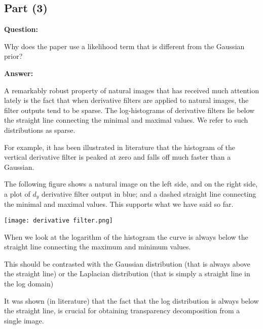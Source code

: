 \documentclass[fleqn, 11pt]{article}
\begin{document}
\subsection*{Part (3)}

\textbf{Question: }

\smallskip

Why does the paper use a likelihood term that is different from the Gaussian prior?

\hrulefill

\smallskip

\textbf{Answer: }

\smallskip

A remarkably robust property of natural images that has received much attention lately is the fact that
when derivative filters are applied to natural images, the filter outputs tend to be sparse. The log-histograms
of derivative filters lie below the straight line connecting the minimal and maximal values. 
We refer to such distributions as sparse. 

\smallskip

For example, it has been illustrated in literature that 
the histogram of the vertical derivative filter is peaked at zero and falls
off much faster than a Gaussian.

\smallskip

The following figure shows a natural image on the left side, and on the right side, a plot of $d_y$ 
derivative filter output in blue; and a dashed straight line connecting the minimal and maximal values.
This supports what we have said so far.

\begin{center}
    \texttt{[image: derivative filter.png]}
\end{center}


When we look at 
the logarithm of the histogram the curve is
always below the straight line connecting the maximum and minimum values. 


\smallskip

This should be contrasted
with the Gaussian distribution (that is always above the straight line) or the Laplacian distribution (that
is simply a straight line in the log domain)

\smallskip

It was shown (in literature) that the fact that the log
distribution is always below the straight line, is crucial for obtaining transparency decomposition from
a single image.

\smallskip
\end{document}
